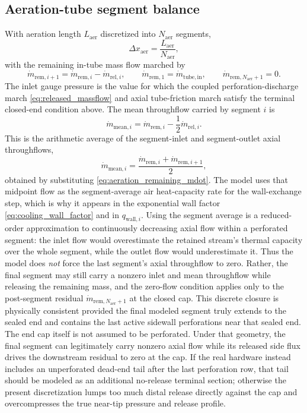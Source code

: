 \documentclass[11pt]{article}
\begin{document}
\subsection{Aeration-tube segment balance}
With aeration length \(L_{\mathrm{aer}}\) discretized into \(N_{\mathrm{aer}}\) segments,
\begin{equation}
\label{eq:aeration_dx}
\Delta x_{\mathrm{aer}}=\frac{L_{\mathrm{aer}}}{N_{\mathrm{aer}}},
\end{equation}
with the remaining in-tube mass flow marched by
\begin{equation}
\label{eq:aeration_remaining_mdot}
\dot m_{\mathrm{rem},i+1}=\dot m_{\mathrm{rem},i}-\dot m_{\mathrm{rel},i},
\qquad
\dot m_{\mathrm{rem},1}=\dot m_{\mathrm{tube,in}},
\qquad
\dot m_{\mathrm{rem},N_{\mathrm{aer}}+1}=0.
\end{equation}
The inlet gauge pressure is the value for which the coupled perforation-discharge march \eqref{eq:released_massflow} and axial tube-friction march satisfy the terminal closed-end condition above. The mean throughflow carried by segment \(i\) is
\begin{equation}
\label{eq:aeration_mean_mdot}
\dot m_{\mathrm{mean},i}=\dot m_{\mathrm{rem},i}-\frac{1}{2}\dot m_{\mathrm{rel},i}.
\end{equation}
This is the arithmetic average of the segment-inlet and segment-outlet axial throughflows,
\[
\dot m_{\mathrm{mean},i}
=
\frac{\dot m_{\mathrm{rem},i}+\dot m_{\mathrm{rem},i+1}}{2},
\]
obtained by substituting \eqref{eq:aeration_remaining_mdot}. The model uses that midpoint flow as the segment-average air heat-capacity rate for the wall-exchange step, which is why it appears in the exponential wall factor \eqref{eq:cooling_wall_factor} and in \(q_{\mathrm{wall},i}\). Using the segment average is a reduced-order approximation to continuously decreasing axial flow within a perforated segment: the inlet flow would overestimate the retained stream's thermal capacity over the whole segment, while the outlet flow would underestimate it.
Thus the model does \emph{not} force the last segment's axial throughflow to zero. Rather, the final segment may still carry a nonzero inlet and mean throughflow while releasing the remaining mass, and the zero-flow condition applies only to the post-segment residual \(\dot m_{\mathrm{rem},N_{\mathrm{aer}}+1}\) at the closed cap.
This discrete closure is physically consistent provided the final modeled segment truly extends to the sealed end and contains the last active sidewall perforations near that sealed end. The end cap itself is not assumed to be perforated. Under that geometry, the final segment can legitimately carry nonzero axial flow while its released side flux drives the downstream residual to zero at the cap. If the real hardware instead includes an unperforated dead-end tail after the last perforation row, that tail should be modeled as an additional no-release terminal section; otherwise the present discretization lumps too much distal release directly against the cap and overcompresses the true near-tip pressure and release profile.
\end{document}
